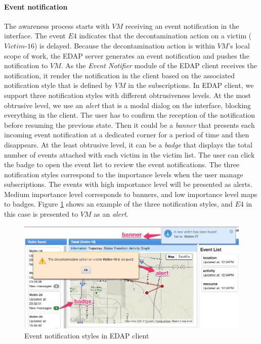 \paragraph*{Event notification} %
\label{par:event_notification}
The awareness process starts with $VM$ receiving an event notification in the interface. The event $E4$ indicates that the decontamination action on a victim ($Victim\textrm{-}16$) is delayed. Because the decontamination action is within $VM$'s local scope of work, the EDAP server generates an event notification and pushes the notification to $VM$. As the \emph{Event Notifier} module of the EDAP client receives the notification, it render the notification in the client based on the associated notification style that is defined by $VM$ in the subscriptions. In EDAP client, we support three notification styles with different obtrusiveness levels. At the most obtrusive level, we use an \emph{alert} that is a modal dialog on the interface, blocking everything in the client. The user has to confirm the reception of the notification before resuming the previous state. Then it could be a \emph{banner} that presents each incoming event notification at a dedicated corner for a period of time and then disappears. At the least obtrusive level, it can be a \emph{badge} that displays the total number of events attached with each victim in the victim list. The user can click the badge to open the event list to review the event notifications. The three notification styles correspond to the importance levels when the user manage subscriptions. The events with high importance level will be presented as alerts. Medium importance level corresponds to banners, and low importance level maps to badges. Figure \ref{fig:vm_interface_notifications} shows an example of the three notification styles, and $E4$ in this case is presented to $VM$ as an \emph{alert}.

\begin{figure}[htbp] %
	\centering
	\includegraphics[width=5.5in]{vm_interface_notifications_marked.jpg} 
	\caption{Event notification styles in EDAP client}
	\label{fig:vm_interface_notifications}
\end{figure}

